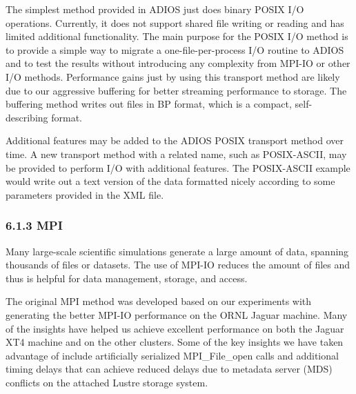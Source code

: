 \vspace{10pt}
The simplest method provided in ADIOS just does binary POSIX I/O operations. Currently, 
it does not support shared file writing or reading and has limited additional functionality. 
The main purpose for the POSIX I/O method is to provide a simple way to migrate 
a one-file-per-process I/O routine to ADIOS and to test the results without introducing 
any complexity from MPI-IO or other I/O methods. Performance gains just by using 
this transport method are likely due to our aggressive buffering for better streaming 
performance to storage. The buffering method writes out files in BP format, which 
is a compact, self-describing format. 

\vspace{10pt}
Additional features may be added to the ADIOS POSIX transport method over time. 
A new transport method with a related name, such as POSIX-ASCII, may be provided 
to perform I/O with additional features. The POSIX-ASCII example would write out 
a text version of the data formatted nicely according to some parameters provided 
in the XML file.\label{HToc84890259}\label{HToc212016635}\label{HToc212016877}\label{HToc182553383}

\vspace{10pt}
\subsubsection*{{\large \textbf{6.1.3 MPI}}}

\vspace{10pt}
Many large-scale scientific simulations generate a large amount of data, spanning 
thousands of files or datasets. The use of MPI-IO reduces the amount of files and 
thus is helpful for data management, storage, and access. 

\vspace{10pt}
The original MPI method was developed based on our experiments with generating 
the better MPI-IO performance on the ORNL Jaguar machine. Many of the insights 
have helped us achieve excellent performance on both the Jaguar XT4 machine and 
on the other clusters. Some of the key insights we have taken advantage of include 
artificially serialized MPI\_File\_open calls and additional timing delays that 
can achieve reduced delays due to metadata server (MDS) conflicts on the attached 
Lustre storage system.

